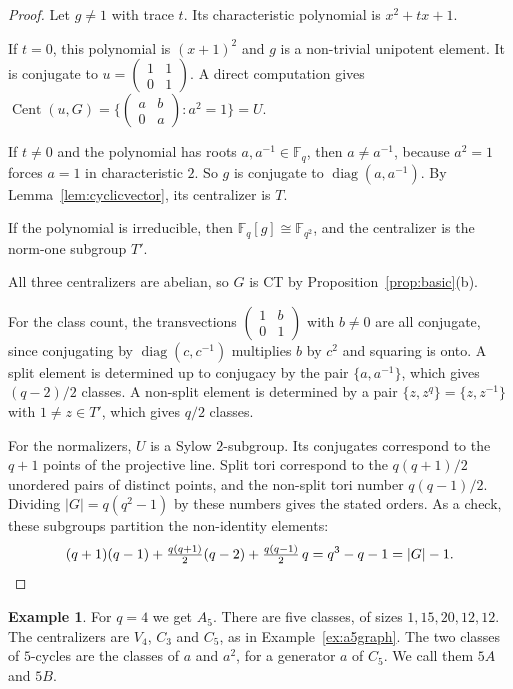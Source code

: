 \documentclass[12pt,letterpaper]{article}
\numberwithin{equation}{section}
\theoremstyle{plain}
\theoremstyle{definition}
\newtheorem{example}[theorem]{Example}
\newcommand{\F}{\mathbb{F}}
\DeclareMathOperator{\Cent}{Cent}
\DeclareMathOperator{\diag}{diag}
\begin{document}
\begin{proof}
Let $g\neq1$ with trace $t$. Its characteristic polynomial is $x^2+tx+1$.

If $t=0$, this polynomial is $(x+1)^2$ and $g$ is a non-trivial unipotent
element. It is conjugate to $u=\left(\begin{smallmatrix}1&1\\0&1
\end{smallmatrix}\right)$. A direct computation gives
$\Cent(u,G)=\{\left(\begin{smallmatrix}a&b\\0&a\end{smallmatrix}\right):
a^2=1\}=U$.

If $t\neq0$ and the polynomial has roots $a,a^{-1}\in\F_q$, then $a\neq
a^{-1}$, because $a^2=1$ forces $a=1$ in characteristic $2$. So $g$ is
conjugate to $\diag(a,a^{-1})$. By Lemma~\ref{lem:cyclicvector}, its
centralizer is $T$.

If the polynomial is irreducible, then $\F_q[g]\cong\F_{q^2}$, and the
centralizer is the norm-one subgroup $T'$.

All three centralizers are abelian, so $G$ is CT by
Proposition~\ref{prop:basic}(b).

For the class count, the transvections $\left(\begin{smallmatrix}1&b\\0&1
\end{smallmatrix}\right)$ with $b\ne0$ are all conjugate, since conjugating
by $\diag(c,c^{-1})$ multiplies $b$ by $c^2$ and squaring is onto. A split
element is determined up to conjugacy by the pair $\{a,a^{-1}\}$, which
gives $(q-2)/2$ classes. A non-split element is determined by a pair
$\{z,z^q\}=\{z,z^{-1}\}$ with $1\ne z\in T'$, which gives $q/2$ classes.

For the normalizers, $U$ is a Sylow $2$-subgroup. Its conjugates correspond
to the $q+1$ points of the projective line. Split tori correspond to the
$q(q+1)/2$ unordered pairs of distinct points, and the non-split tori number
$q(q-1)/2$. Dividing $|G|=q(q^2-1)$ by these numbers gives the stated
orders. As a check, these subgroups partition the non-identity elements:
\[
(q+1)(q-1)+\tfrac{q(q+1)}{2}(q-2)+\tfrac{q(q-1)}{2}\,q=q^3-q-1=|G|-1.
\qedhere
\]
\end{proof}

\begin{example}\label{ex:a5classes}
For $q=4$ we get $A_5$. There are five classes, of sizes $1,15,20,12,12$.
The centralizers are $V_4$, $C_3$ and $C_5$, as in
Example~\ref{ex:a5graph}. The two classes of $5$-cycles are the classes of
$a$ and $a^2$, for a generator $a$ of $C_5$. We call them $5A$ and $5B$.
\end{example}
\end{document}
